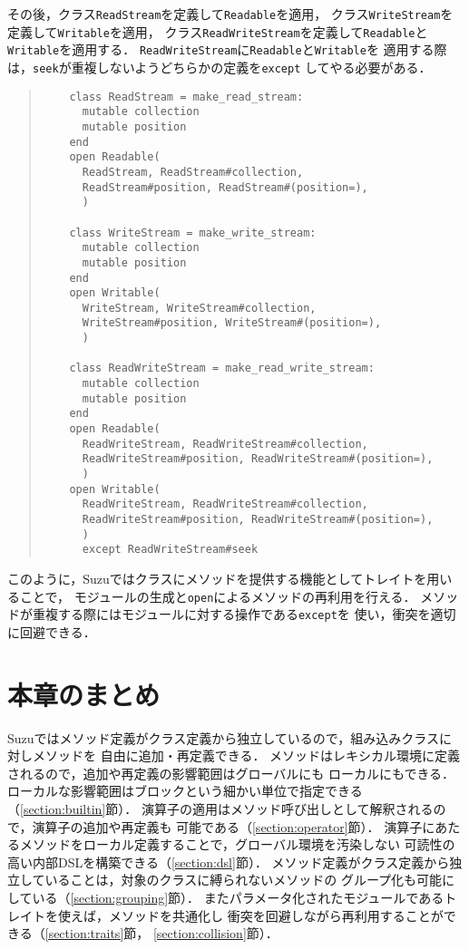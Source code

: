 \documentclass[a4paper,11pt,dvipdfmx]{jreport}
\begin{document}
その後，クラス\verb|ReadStream|を定義して\verb|Readable|を適用，
クラス\verb|WriteStream|を定義して\verb|Writable|を適用，
クラス\verb|ReadWriteStream|を定義して\verb|Readable|と
\verb|Writable|を適用する．
\verb|ReadWriteStream|に\verb|Readable|と\verb|Writable|を
適用する際は，\verb|seek|が重複しないようどちらかの定義を\verb|except|
してやる必要がある．
\begin{quote}
	\begin{verbatim}
	class ReadStream = make_read_stream:
	  mutable collection
	  mutable position
	end
	open Readable(
	  ReadStream, ReadStream#collection,
	  ReadStream#position, ReadStream#(position=),
	  )
	
	class WriteStream = make_write_stream:
	  mutable collection
	  mutable position
	end
	open Writable(
	  WriteStream, WriteStream#collection,
	  WriteStream#position, WriteStream#(position=),
	  )
	
	class ReadWriteStream = make_read_write_stream:
	  mutable collection
	  mutable position
	end
	open Readable(
	  ReadWriteStream, ReadWriteStream#collection,
	  ReadWriteStream#position, ReadWriteStream#(position=),
	  )
	open Writable(
	  ReadWriteStream, ReadWriteStream#collection,
	  ReadWriteStream#position, ReadWriteStream#(position=),
	  )
	  except ReadWriteStream#seek
	\end{verbatim}
\end{quote}
このように，Suzuではクラスにメソッドを提供する機能としてトレイトを用いることで，
モジュールの生成と\verb|open|によるメソッドの再利用を行える．
メソッドが重複する際にはモジュールに対する操作である\verb|except|を
使い，衝突を適切に回避できる．


\section{本章のまとめ}

Suzuではメソッド定義がクラス定義から独立しているので，組み込みクラスに対しメソッドを
自由に追加・再定義できる．
メソッドはレキシカル環境に定義されるので，追加や再定義の影響範囲はグローバルにも
ローカルにもできる．
ローカルな影響範囲はブロックという細かい単位で指定できる
（\ref{section:builtin}節）．
演算子の適用はメソッド呼び出しとして解釈されるので，演算子の追加や再定義も
可能である（\ref{section:operator}節）．
演算子にあたるメソッドをローカル定義することで，グローバル環境を汚染しない
可読性の高い内部DSLを構築できる（\ref{section:dsl}節）．
メソッド定義がクラス定義から独立していることは，対象のクラスに縛られないメソッドの
グループ化も可能にしている（\ref{section:grouping}節）．
またパラメータ化されたモジュールであるトレイトを使えば，メソッドを共通化し
衝突を回避しながら再利用することができる（\ref{section:traits}節，
\ref{section:collision}節）．
\end{document}
